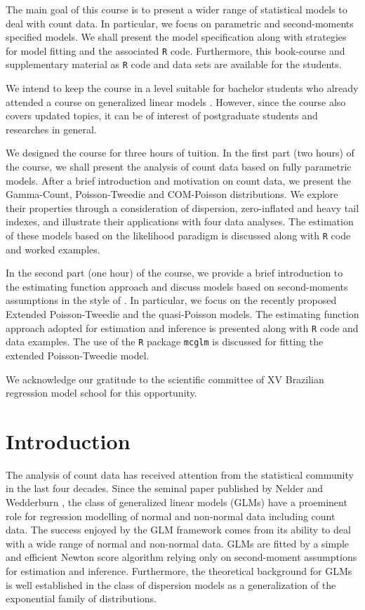 \documentclass[9pt,a5paper,]{book}
\begin{document}
The main goal of this course is to present a wider range of statistical
models to deal with count data. In particular, we focus on parametric
and second-moments specified models. We shall present the model
specification along with strategies for model fitting and the associated
\texttt{R} code. Furthermore, this book-course and supplementary
material as \texttt{R} \citep{R2015} code and data sets are available
for the students.

We intend to keep the course in a level suitable for bachelor students
who already attended a course on generalized linear models
\citep{Nelder1972}. However, since the course also covers updated
topics, it can be of interest of postgraduate students and researches in
general.

We designed the course for three hours of tuition. In the first part
(two hours) of the course, we shall present the analysis of count data
based on fully parametric models. After a brief introduction and
motivation on count data, we present the Gamma-Count, Poisson-Tweedie
and COM-Poisson distributions. We explore their properties through a
consideration of dispersion, zero-inflated and heavy tail indexes, and
illustrate their applications with four data analyses. The estimation of
these models based on the likelihood paradigm is discussed along with
\texttt{R} code and worked examples.

In the second part (one hour) of the course, we provide a brief
introduction to the estimating function approach \citetext{\citealp[
]{Jorgensen2004}; \citealp{Bonat2016a}} and discuss models based on
second-moments assumptions in the style of \citet{Wedderburn1974}. In
particular, we focus on the recently proposed Extended Poisson-Tweedie
\citep{Bonat2016b} and the quasi-Poisson models. The estimating function
approach adopted for estimation and inference is presented along with
\texttt{R} code and data examples. The use of the \texttt{R} package
\texttt{mcglm} \citep{Bonat2016c} is discussed for fitting the extended
Poisson-Tweedie model.

We acknowledge our gratitude to the scientific committee of XV Brazilian
regression model school for this opportunity.

\chapter{Introduction}\label{introduction}

The analysis of count data has received attention from the statistical
community in the last four decades. Since the seminal paper published by
Nelder and Wedderburn \citep{Nelder1972}, the class of generalized
linear models (GLMs) have a proeminent role for regression modelling of
normal and non-normal data including count data. The success enjoyed by
the GLM framework comes from its ability to deal with a wide range of
normal and non-normal data. GLMs are fitted by a simple and efficient
Newton score algorithm relying only on second-moment assumptions for
estimation and inference. Furthermore, the theoretical background for
GLMs is well established in the class of dispersion models
\citep{Jorgensen1987, Jorgensen1997} as a generalization of the
exponential family of distributions.
\end{document}
